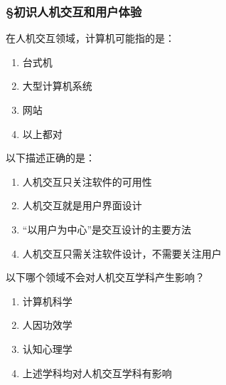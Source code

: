 \subsubsection*{\S 初识人机交互和用户体验}
\setcounter{problemname}{0}

\begin{problem}
	‍在人机交互领域，计算机可能指的是：
    \vspace{-0.8em}
    \begin{multicols}{4}
        \begin{enumerate}[label=\Alph*.]
            \item 台式机
            \item 大型计算机系统
            \item 网站
            \item 以上都对
        \end{enumerate}
    \end{multicols}
    \vspace{-1em}
\end{problem}




\begin{problem}
	‍以下描述正确的是： 
    \vspace{-0.8em}
    \begin{multicols}{2}
        \begin{enumerate}[label=\Alph*.]
            \item 人机交互只关注软件的可用性
            \item 人机交互就是用户界面设计
            \item “以用户为中心”是交互设计的主要方法
            \item 人机交互只需关注软件设计，不需要关注用户
        \end{enumerate}
    \end{multicols}
    \vspace{-1em}
\end{problem}


\begin{problem}
	以下哪个领域不会对人机交互学科产生影响？
    \vspace{-0.8em}
    \begin{multicols}{2}
        \begin{enumerate}[label=\Alph*.]
            \item 计算机科学
            \item 人因功效学
            \item 认知心理学
            \item 上述学科均对人机交互学科有影响
        \end{enumerate}
    \end{multicols}
    \vspace{-1em}
\end{problem}



